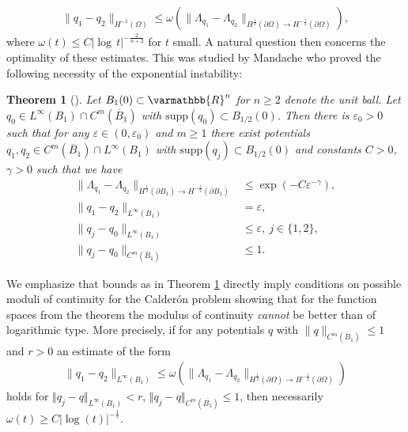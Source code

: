 \documentclass[12pt,twoside]{amsart}
\numberwithin{equation}{section}
\renewcommand{\le}{\leqslant}
\renewcommand{\leq}{\leqslant}
\renewcommand{\geq}{\geqslant}
\renewcommand{\mathbb}{\varmathbb}
\newtheorem{theorem}{Theorem}[section]
\newcommand {\R} {\mathbb{R}} \newcommand {\Z} {\mathbb{Z}}
\newcommand {\p} {\partial}
\newcommand{\abs}[1]{\lvert #1 \rvert}          %
\newcommand{\ol}[1]{\overline{#1}}
\newcommand{\eps}{\varepsilon}
\newcommand{\supp}{\mathrm{supp}}
\begin{document}
\begin{align*}
\|q_1-q_2\|_{H^{-1}(\Omega)}
 \leq \omega(\|\Lambda_{q_1}-\Lambda_{q_2}\|_{H^{\frac{1}{2}}(\partial \Omega) \rightarrow H^{-\frac{1}{2}}(\p \Omega)}),
\end{align*}
where $\omega(t) \leq C \abs{\log\,t}^{-\frac{2}{n+2}}$ for $t$ small. A natural question then concerns the optimality of these estimates. This was studied by Mandache \cite{Mandache} who proved the following necessity of the exponential instability:

\begin{theorem}[\cite{Mandache}]
\label{thm:Mandache_Cal}
Let $B_1(0) \subset \R^n$ for $n\geq 2$ denote the unit ball. Let $q_0 \in L^{\infty}(B_1)\cap C^m(\overline{B}_1) $ with $\supp(q_0) \subset B_{1/2}(0)$. Then there is $\eps_0>0$ such that for any $\eps\in (0,\eps_0)$ and $m \geq 1$ there exist potentials  $q_1, q_2 \in C^m(\ol{B}_1)\cap L^{\infty}(B_1)$ with $\supp(q_j)\subset B_{1/2}(0)$ and constants $C>0$, $\gamma>0$ such that we have
\begin{align*}
\|\Lambda_{q_1}- \Lambda_{q_2}\|_{H^{\frac{1}{2}}(\partial B_1) \rightarrow H^{-\frac{1}{2}}(\partial B_1)} 
&\leq  \exp(-C\eps^{-\gamma}),\\
\|q_1 -q_2\|_{L^{\infty}(B_1)}& = \eps,\\
\|q_j - q_0\|_{L^{\infty}(B_1)} & \leq \eps, \ j \in \{1,2\},\\
\|q_j - q_0\|_{C^m(\ol{B}_1)} & \leq 1.
\end{align*}
\end{theorem}

We emphasize that bounds as in Theorem \ref{thm:Mandache_Cal} directly imply conditions on possible moduli of continuity for the Calder\'on problem showing that for the function spaces from the theorem the modulus of continuity \emph{cannot} be better than of logarithmic type. More precisely, if for any potentials $q$ with $\|q\|_{C^m(\ol{B}_1)}\leq 1$ and $r>0$ an estimate of the form 
\begin{align*}
\|q_1- q_2\|_{L^{\infty}(B_1)} \leq \omega(\|\Lambda_{q_1}-\Lambda_{q_2}\|_{H^{\frac{1}{2}}(\partial \Omega) \rightarrow H^{-\frac{1}{2}}(\p \Omega)})
\end{align*}
holds for $ \Vert q_j-q \Vert_{L^\infty(B_1)} < r$, $ \Vert q_j-q \Vert_{C^m(\overline{B_1})}\le 1$, then necessarily $\omega(t)\geq C|\log(t)|^{-\frac{1}{\gamma}}$. 
\end{document}
